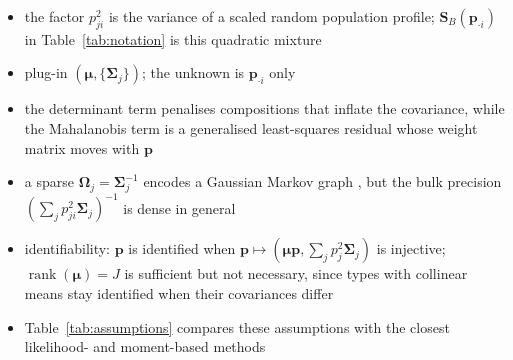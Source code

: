 \documentclass[pdflatex, sn-nature]{sn-jnl}
\theoremstyle{thmstyleone}%
\theoremstyle{thmstyletwo}%
\theoremstyle{thmstylethree}%
\begin{document}
\begin{itemize}
  \item the factor \(p_{ji}^{2}\) is the variance of a scaled random population profile;
        \(\boldsymbol{S}_{B}(\boldsymbol{p}_{\cdot i})\) in Table~\ref{tab:notation} is this quadratic mixture
  \item plug-in \((\boldsymbol{\mu},\{\boldsymbol{\Sigma}_{j}\})\); the unknown is \(\boldsymbol{p}_{\cdot i}\) only
  \item the determinant term penalises compositions that inflate the covariance, while the
        Mahalanobis term is a generalised least-squares residual whose weight matrix moves with
        \(\boldsymbol{p}\)
  \item a sparse \(\boldsymbol{\Omega}_{j}=\boldsymbol{\Sigma}_{j}^{-1}\) encodes a Gaussian Markov graph
        \cite{friedmanSparseInverseCovariance2008,chiquetVariationalInferenceSparse2018}, but the bulk
        precision \((\sum_{j}p_{ji}^{2}\boldsymbol{\Sigma}_{j})^{-1}\) is dense in general
  \item identifiability: \(\boldsymbol{p}\) is identified when
        \(\boldsymbol{p}\mapsto(\boldsymbol{\mu}\boldsymbol{p},\sum_{j}p_{j}^{2}\boldsymbol{\Sigma}_{j})\) is
        injective; \(\operatorname{rank}(\boldsymbol{\mu})=J\) is sufficient but not necessary, since types
        with collinear means stay identified when their covariances differ
  \item Table~\ref{tab:assumptions} compares these assumptions with the closest likelihood- and
        moment-based methods
\end{itemize}
\end{document}
